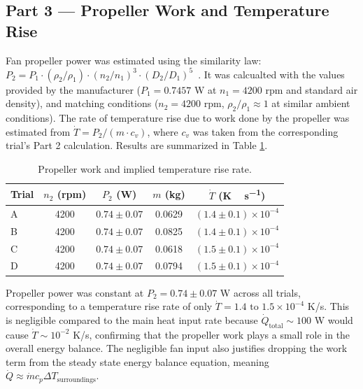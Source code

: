 \documentclass[12pt]{article}
\begin{document}
\subsection*{Part 3 — Propeller Work and Temperature Rise}

Fan propeller power was estimated using the similarity law: $P_2 = P_1 \cdot (\rho_2/\rho_1) \cdot (n_2/n_1)^3 \cdot (D_2/D_1)^5$~\cite{che260_manual}. It was calcualted with the values provided by the manufacturer ($P_1 = 0.7457$ W at $n_1 = 4200$ rpm and standard air density), and matching conditions ($n_2 = 4200$ rpm, $\rho_2/\rho_1 \approx 1$ at similar ambient conditions).
The rate of temperature rise due to work done by the propeller was estimated from $\dot{T} = P_2 / (m \cdot c_v)$, where $c_v$ was taken from the corresponding trial's Part 2 calculation. Results are summarized in Table \ref{tab:prop}.

\begin{table}[H]\centering
\begin{tabular}{@{}lcccc@{}}
\toprule
Trial & $n_2$ (rpm) & $P_2$ (W) & $m$ (kg) & $\dot T$ (\si{K\,s^{-1}}) \\
\midrule
A & 4200 & $0.74 \pm 0.07$ & 0.0629 & $(1.4 \pm 0.1) \times 10^{-4}$ \\
B & 4200 & $0.74 \pm 0.07$ & 0.0825 & $(1.4 \pm 0.1) \times 10^{-4}$ \\
C & 4200 & $0.74 \pm 0.07$ & 0.0618 & $(1.5 \pm 0.1) \times 10^{-4}$ \\
D & 4200 & $0.74 \pm 0.07$ & 0.0794 & $(1.5 \pm 0.1) \times 10^{-4}$ \\
\bottomrule
\end{tabular}
\caption{Propeller work and implied temperature rise rate.}
\label{tab:prop}
\end{table}

Propeller power was constant at $P_2 = 0.74 \pm 0.07$ W across all trials, corresponding to a temperature rise rate of only $\dot{T} = 1.4 \text{ to } 1.5 \times 10^{-4}$ K/s. 
This is negligible compared to the main heat input rate because $\dot{Q}_{\text{total}} \sim 100$ W would cause $\dot{T} \sim 10^{-2}$ K/s, confirming that the propeller work plays a small role in the overall energy balance. The negligible fan input also justifies dropping the work term from the steady state energy balance equation, meaning $\dot{Q} \approx \dot{m} c_p \Delta T_{\text{surroundings}}$. 
\end{document}
